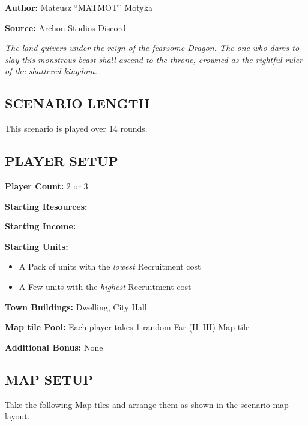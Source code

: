 
\begin{multicols*}{2}

\textbf{Author:} Mateusz ``MATMOT'' Motyka

\textbf{Source:} \href{https://discord.com/channels/740870068178649108/1229888426975821926}{Archon Studios Discord}

\textit{The land quivers under the reign of the fearsome Dragon.
  The one who dares to slay this monstrous beast shall ascend to the throne, crowned as the rightful ruler of the shattered kingdom.
}

\subsection*{\MakeUppercase{Scenario Length}}
This scenario is played over 14 rounds.

\subsection*{\MakeUppercase{Player Setup}}
\textbf{Player Count:} 2 or 3

\textbf{Starting Resources:}\par
{}

\textbf{Starting Income:}\par
{}

\textbf{Starting Units:}
\begin{itemize}
  \item A Pack of  units with the \textit{lowest} Recruitment cost
  \item A Few  units with the \textit{highest} Recruitment cost
\end{itemize}

\textbf{Town Buildings:}  Dwelling, City Hall

\textbf{Map tile Pool:} Each player takes 1 random Far (II--III) Map tile

\textbf{Additional Bonus:} None

\subsection*{\MakeUppercase{Map Setup}}

Take the following Map tiles and arrange them as shown in the scenario map layout.


\end{multicols*}
